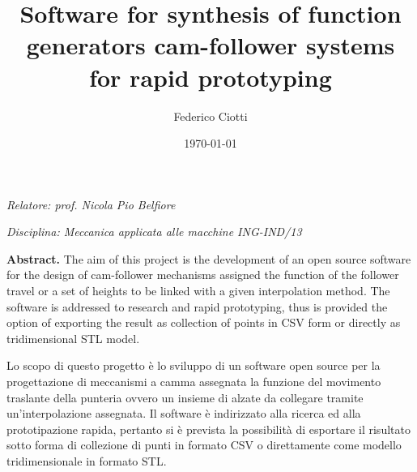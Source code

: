 \documentclass[a4paper,10pt,twoside]{article}
\title{Software for synthesis of function generators cam-follower systems for rapid prototyping}
\author{Federico Ciotti}
\date{\today}
\begin{document}
\begin{titlepage}
    \thispagestyle{first}

    \vspace*{2cm}
    \large
    \begin{center}
        \makeatletter
        {\Large\textbf{\@title}}\par
        \vspace{\baselineskip}
        \textit{\@author}\par
        \makeatother
    \end{center}
    \normalsize
    \vspace{1.5cm}
    \textit{Relatore: prof. Nicola Pio Belfiore}\par
    \vspace{0.2cm}
    \textit{Disciplina: Meccanica applicata alle macchine ING-IND/13}\par
    \vspace{1cm}
    \textbf{Abstract.} The aim of this project is the development of an open source software for the design of cam-follower
    mechanisms assigned the function of the follower travel or a set of heights to be linked with a given interpolation method.
    The software is addressed to research and rapid prototyping, thus is provided the option of exporting the result as
    collection of points in CSV form or directly as tridimensional STL model.\par
    \bigskip
    Lo scopo di questo progetto è lo sviluppo di un software open source per la progettazione di meccanismi a camma
    assegnata la funzione del movimento traslante della punteria ovvero un insieme di alzate da collegare
    tramite un'interpolazione assegnata. Il software è indirizzato alla ricerca ed alla prototipazione rapida, pertanto si
    è prevista la possibilità di esportare il risultato sotto forma di collezione di punti in formato CSV o direttamente
    come modello tridimensionale in formato STL.
\end{titlepage}

\fancyhfoffset[E,O]{0pt}
\cleardoublepage
\end{document}
